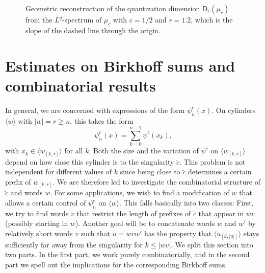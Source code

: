 \documentclass[11pt,reqno]{amsart}
\theoremstyle{plain}
\theoremstyle{definition}
\begin{document}
\begin{figure}%
    \caption{\label{Dr}Geometric reconstruction of the quantization dimension $\mathsf{D}_{r}(\mu_{c})$ from the $L^{q}$-spectrum of $\mu_{c}$ with $c=1/2$ and   $r=1.2$, which is the slope of the dashed line through the origin.
    }
\end{figure}



\section{Estimates on Birkhoff sums and combinatorial results}\label{sec:Technical}

In general, we are concerned with expressions of the form $\psi_n^c(x)$. On cylinders $\langle w \rangle$ with $|w| = r \geqslant n$, this takes the form
\[
\psi^c_n(x) = \sum_{k = 0}^{n-1} \psi^c(x_k),
\]
with $x_k \in \langle w_{[k,r]} \rangle$ for all $k$. Both the size and the variation of $\psi^c$ on $\langle w_{[k,r]} \rangle$ depend on how close this cylinder is to the singularity $\breve{c}$. This problem is not independent for different values of $k$ since being close to $\breve{c}$ determines a certain prefix of $w_{[k,r]}$. We are therefore led to investigate the combinatorial structure of $\breve{c}$ and words $w$. For some applications, we wish to find a modification of $w$ that allows a certain control of $\psi_n^c$ on $\langle w \rangle$. This falls basically into two classes: First, we try to find words $v$ that restrict the length of prefixes of $\breve{c}$ that appear in $wv$ (possibly starting in $w$). Another goal will be to concatenate words $w$ and $w'$ by relatively short words $v$ such that $u = w v w'$ has the property that $\langle u_{[k,|u|]} \rangle$ stays sufficiently far away from the singularity for $k \leqslant |wv|$. 
We split this section into two parts. In the first part, we work purely combinatorially, and in the second part we spell out the implications for the corresponding Birkhoff sums.
\end{document}
